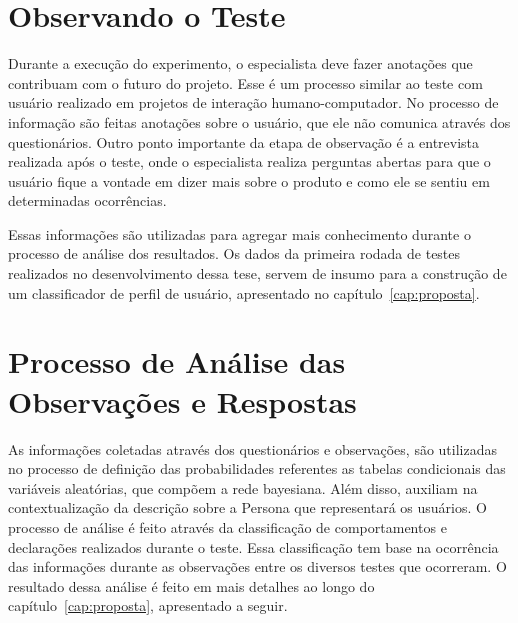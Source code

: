 \section{Observando o Teste}
\label{sec:observacoesteste}
Durante a execução do experimento, o especialista deve fazer anotações que contribuam com o futuro do projeto. Esse é um processo similar ao teste com usuário realizado em projetos de interação humano-computador. No processo de informação são feitas anotações sobre o usuário, que ele não comunica através dos questionários. Outro ponto importante da etapa de observação é a entrevista realizada após o teste, onde o especialista realiza perguntas abertas para que o usuário fique a vontade em dizer mais sobre o produto e como ele se sentiu em determinadas ocorrências.

Essas informações são utilizadas para agregar mais conhecimento durante o processo de análise dos resultados. Os dados da primeira rodada de testes realizados no desenvolvimento dessa tese, servem de insumo para a construção de um classificador de perfil de usuário, apresentado no capítulo~\ref{cap:proposta}.

\section{Processo de Análise das Observações e Respostas}
\label{sec:analise}
As informações coletadas através dos questionários e observações, são utilizadas no processo de definição das probabilidades referentes as tabelas condicionais das variáveis aleatórias, que compõem a rede bayesiana. Além disso, auxiliam na contextualização da descrição sobre a Persona que representará os usuários. O processo de análise é feito através da classificação de comportamentos e declarações realizados durante o teste. Essa classificação tem base na ocorrência das informações durante as observações entre os diversos testes que ocorreram. O resultado dessa análise é feito em mais detalhes ao longo do capítulo~\ref{cap:proposta}, apresentado a seguir.
